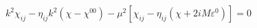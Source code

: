 \begin{equation}
k^2\chi_{ij} - \eta_{ij}k^2(\chi - \chi^{00}) - \mu^2[\chi_{ij} - \eta_{ij}
(\chi + 2iM\varepsilon^0)] =0
\label{76}
\end{equation}

